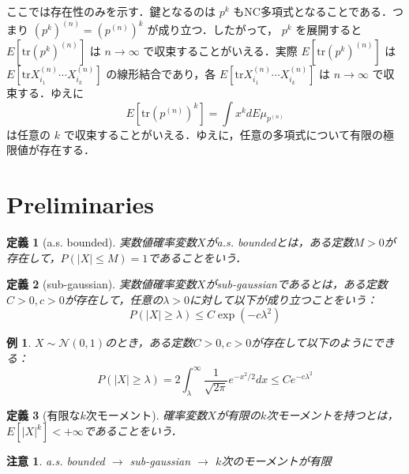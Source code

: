 \documentclass{ltjsarticle}
\makeatletter
\theoremstyle{mystyle1}
\newtheorem{dfn}{定義}[section]
\theoremstyle{mystyle2}
\newtheorem{example}{例}
\newtheorem{note*}{注意}
\theoremstyle{mystyle3}
\renewenvironment{proof}[1][\proofname]{\par
  \pushQED{\qed}%
  \normalfont
  \topsep6\p@\@plus6\p@ \trivlist
  \item[\hskip\labelsep{\bfseries\sffamily #1}]\ignorespaces
}{%
  \popQED\endtrivlist\@endpefalse
}
\renewcommand\proofname{証明}
\makeatother
\begin{document}
\begin{proof}
    ここでは存在性のみを示す．鍵となるのは $p^k$ もNC多項式となることである．つまり $(p^k)^{(n)}=(p^{(n)})^k$ が成り立つ．したがって， $p^k$ を展開すると $E[\mathrm{tr}(p^k)^{(n)}]$ は $n\to\infty$ で収束することがいえる．実際 $E[\mathrm{tr}(p^k)^{(n)}]$ は $E[\mathrm{tr}X_{i_1}^{(n)}\cdots X_{i_k}^{(n)}]$ の線形結合であり，各 $E[\mathrm{tr}X_{i_1}^{(n)}\cdots X_{i_k}^{(n)}]$ は $n\to\infty$ で収束する．ゆえに
    \begin{equation}
        E[\mathrm{tr}(p^{(n)})^k]=\int x^k dE\mu_{p^{(n)}}
    \end{equation}
    は任意の $k$ で収束することがいえる．ゆえに，任意の多項式について有限の極限値が存在する．
\end{proof}
\section{Preliminaries}

\begin{dfn}[a.s. bounded]
    実数値確率変数$X$がa.s. boundedとは，ある定数$M>0$が存在して，$P(|X|\leq M)=1$であることをいう．
\end{dfn}

\begin{dfn}[sub-gaussian]
    実数値確率変数$X$がsub-gaussianであるとは，ある定数$C>0,c>0$が存在して，任意の$\lambda>0$に対して以下が成り立つことをいう：
    \begin{equation}
        P(|X|\geq\lambda)\leq C\exp(-c\lambda^2)
    \end{equation}
\end{dfn}

\begin{example}
    $X\sim\mathcal{N}(0,1)$のとき，ある定数$C>0,c>0$が存在して以下のようにできる：
    \begin{equation}
        P(|X|\geq\lambda)=2\int_\lambda^\infty \frac{1}{\sqrt{2\pi}}e^{-x^2/2}dx\leq Ce^{-c\lambda^2}
    \end{equation}
\end{example}

\begin{dfn}[有限な$k$次モーメント]
    確率変数$X$が有限の$k$次モーメントを持つとは，$E[|X|^k]<+\infty$であることをいう．
\end{dfn}

\begin{note*}
    a.s. bounded $\rightarrow$ sub-gaussian $\rightarrow$ $k$次のモーメントが有限
\end{note*}
\end{document}
